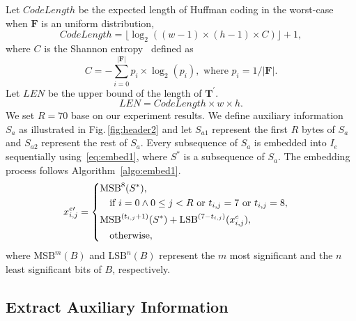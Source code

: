 \documentclass[journal]{IEEEtran}
\begin{document}
	Let \(CodeLength\) be the expected length of Huffman coding in the worst-case when \(\mathbf{F}\) is an uniform distribution, 
%	
	\begin{equation}
		\label{eq:floor}
		CodeLength = \lfloor \log_2((w - 1) \times (h - 1) \times C ) \rfloor + 1 , 
	\end{equation} 
%
	where \(C\) is the Shannon entropy~\cite{Shannon1948} defined as
%	
	\begin{equation}
		C = - \sum_{i = 0}^{\vert \mathbf{F} \vert} p_i \times \log_2 (p_i), \text{ where } p_i = 1 / {\vert \mathbf{F} \vert}.
	\end{equation}
%
	Let \(LEN\) be the upper bound of the length of \(\mathbf{T^\prime}\).
%	
	\begin{equation}
		\label{eq:len}
		LEN = CodeLength \times w \times h.
	\end{equation}
%
	We set \(R = 70\) base on our experiment results.
	We define auxiliary information \(S_a\) as illustrated in Fig.\,\ref{fig:header2} and let \(S_{a1}\) represent the first \(R\) bytes of \(S_a\) and \(S_{a2}\) represent the rest of \(S_a\). 
	Every subsequence of \(S_a\) is embedded into \(I_e\) sequentially using~\eqref{eq:embed1}, where \(S^\ast\) is a subsequence of \(S_a\). 
	The embedding process follows Algorithm~\ref{algo:embed1}.
%
	\begin{align}
		\label{eq:embed1}
		x^{e\prime}_{i, j}  &= 
		\begin{dcases}
			\mathrm{MSB}^8(S^\ast)                   , \\
			\quad \text{if }  i = 0 \wedge  0 \leq j < R \text{ or } t_{i, j} = 7 \text{ or } t_{i, j} = 8, \\
			\mathrm{MSB}^{(t_{i, j} + 1)}(S^\ast) + \mathrm{LSB}^{(7 - t_{i, j})}(x^e_{i, j}),  \\
			\quad \text{otherwise},
		\end{dcases}  
	\end{align}
	where \(\mathrm{MSB}^{m}(B)\) and \(\mathrm{LSB}^{n}(B)\) represent the \(m\) most significant and the \(n\) least significant bits of \(B\), respectively.
		
	
	\subsection{Extract Auxiliary Information}
\end{document}
